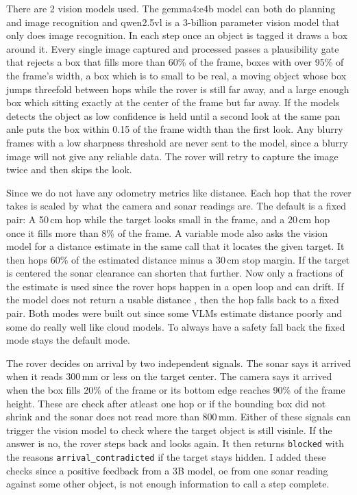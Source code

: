 There are 2 vision models used. The gemma4:e4b model can both do planning and image recognition and qwen2.5vl is a 3-billion parameter vision model that only does image recognition.
In each step once an object is tagged it draws a box around it. Every single image captured and processed passes a plausibility gate that rejects a box that fills more than 60\%
of the frame, boxes with over 95\% of the frame's width, a box which is to small to be real, a moving object whose box jumps threefold between hops while the rover is still far away, and 
a large enough box which sitting exactly at the center of the frame but far away. If the models detects the object as low confidence is held until a second look at the same pan anle puts the box
within 0.15 of the frame width than the first look. Any blurry frames with a low sharpness threshold are never sent to the model, since a blurry image will not give any reliable data. The rover
will retry to capture the image twice and then skips the look.

Since we do not have any odometry metrics like distance. Each hop that the rover takes is scaled by what the camera and sonar readings are. The default is a fixed pair: A 50\,cm hop while
the target looks small in the frame, and a 20\,cm hop once it fills more than 8\% of the frame. A variable mode also asks the vision model for a distance estimate in the same call that it locates 
the given target. It then hops 60\% of the estimated distance minus a 30\,cm stop margin. If the target is centered the sonar clearance can shorten that further. Now only a fractions of the
estimate is used since the rover hops happen in a open loop and can drift. If the model does not return a usable distance , then the hop falls back to a fixed pair. Both modes were built out since
some VLMs estimate distance poorly and some do really well like cloud models. To always have a safety fall back the fixed mode stays the default mode.

The rover decides on arrival by two independent signals. The sonar says it arrived when it reads 300\,mm or less on the target center. The camera says it arrived when the box fills 20\%
of the frame or its bottom edge reaches 90\% of the frame height. These are check after atleast one hop or if the bounding box did not shrink and the sonar does not read more than 800\,mm.
Either of these signals can trigger the vision model to check where the target object is still visinle. If the answer is no, the rover steps back and looks again. It then returns \texttt{blocked} with
the reasons \texttt{arrival\_contradicted} if the target stays hidden. I added these checks since a positive feedback from a 3B model, oe from one sonar reading  against some other object, is not 
enough information to call a step complete.

